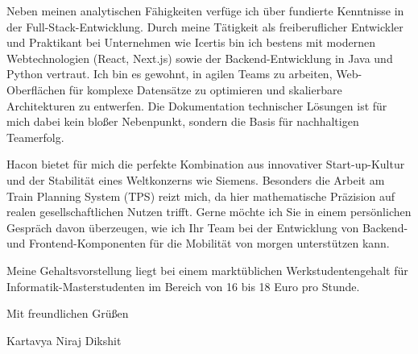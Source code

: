 \documentclass[a4paper,10pt]{article}
\begin{document}
Neben meinen analytischen Fähigkeiten verfüge ich über fundierte Kenntnisse in der Full-Stack-Entwicklung. Durch meine Tätigkeit als freiberuflicher Entwickler und Praktikant bei Unternehmen wie Icertis bin ich bestens mit modernen Webtechnologien (React, Next.js) sowie der Backend-Entwicklung in Java und Python vertraut. Ich bin es gewohnt, in agilen Teams zu arbeiten, Web-Oberflächen für komplexe Datensätze zu optimieren und skalierbare Architekturen zu entwerfen. Die Dokumentation technischer Lösungen ist für mich dabei kein bloßer Nebenpunkt, sondern die Basis für nachhaltigen Teamerfolg.

Hacon bietet für mich die perfekte Kombination aus innovativer Start-up-Kultur und der Stabilität eines Weltkonzerns wie Siemens. Besonders die Arbeit am Train Planning System (TPS) reizt mich, da hier mathematische Präzision auf realen gesellschaftlichen Nutzen trifft. Gerne möchte ich Sie in einem persönlichen Gespräch davon überzeugen, wie ich Ihr Team bei der Entwicklung von Backend- und Frontend-Komponenten für die Mobilität von morgen unterstützen kann.

Meine Gehaltsvorstellung liegt bei einem marktüblichen Werkstudentengehalt für Informatik-Masterstudenten im Bereich von 16 bis 18 Euro pro Stunde.

Mit freundlichen Grüßen

\vspace{1cm}
Kartavya Niraj Dikshit
\end{document}
